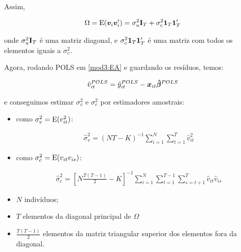 \documentclass[11pt, oneside, a4paper, article]{article}
\numberwithin{equation}{section}
\begin{document}
\begin{description}
	Assim, 

	\vspace{-1 em}
	\begin{align*}
		\Omega 
		= 
		\text{E}(\boldsymbol{v}_{i} \boldsymbol{v}_{i}') = \sigma^{2}_{u} \mathbf{I}_{T} + \sigma_{c}^{2} \boldsymbol{1}_{T} \boldsymbol{1}_{T}'
	\end{align*}

	\noindent
	onde
	$\sigma^{2}_{u} \mathbf{I}_{T}$ 
	é uma matriz diagonal, e 
	$\sigma_{c}^{2} \boldsymbol{1}_{T} \boldsymbol{1}_{T}'$ é uma matriz com todos os elementos iguais a $\sigma_{c}^{2}$.

	Agora, rodando POLS em \eqref{mod3:EA} e guardando os resíduos, temos:

	\vspace{-1 em}
	\begin{align*}
		\hat{v}_{it}^{POLS}
		= 
		\hat{y}_{it}^{POLS} - \boldsymbol{x}_{it} \boldsymbol{\hat{\beta}}^{POLS}
	\end{align*}

	\noindent
	e conseguimos estimar $\sigma_{v}^{2}$ e $\sigma_{c}^{2}$ por estimadores amostrais:

	\begin{itemize}\itemsep0pt
		\item 
			como $\sigma_{v}^{2} = \text{E}(v_{it}^{2})$:

			\vspace{-1.5 em}
			\begin{align*}
				\hat{\sigma}_{v}^{2} =
				(NT - K)^{-1} 
				\sum_{i=1}^{N}
				\sum_{t=1}^{T}
				\hat{v}_{it}^2
			\end{align*}
			\vspace{-1.5 em}

		\item 
			como $\sigma_{c}^{2} = \text{E}(v_{it} v_{is})$:

			\vspace{-1.5 em}
			\begin{align*}
				\hat{\sigma}_{c}^{2} =
				\left[ N \frac{T ( T-1 )}{2} - K  \right]^{-1}
				\sum_{i=1}^{N}
				\sum_{t=1}^{T-1}
				\sum_{s=t+1}^{T}
				\hat{v}_{it} \hat{v}_{is}
			\end{align*}
			\vspace{-1.5 em}

		\item $N$ indivíduos;

		\item $T$ elementos da diagonal principal de $\Omega$

		\item $\frac{T ( T - 1)}{2}$ elementos da matriz triangular superior dos elementos fora da diagonal.


\end{itemize}
\end{description}
\end{document}
